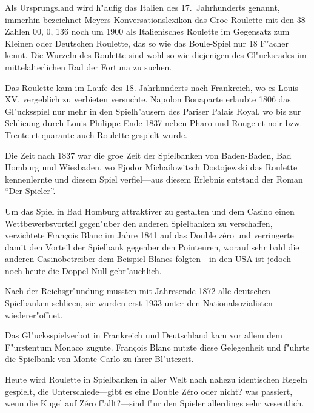 Als Ursprungsland wird h"aufig das Italien des 17.~Jahrhunderts
genannt, immerhin bezeichnet Meyers Konversationslexikon das Gro\3e
Roulette mit den 38 Zahlen 00, 0, 136 noch um 1900 als Italienisches
Roulette  im Gegensatz zum Kleinen oder Deutschen Roulette, das so
wie das Boule-Spiel nur 18 F"acher kennt. Die Wurzeln des Roulette
sind wohl so wie diejenigen des Gl"ucksrades im mittelalterlichen Rad
der Fortuna zu suchen.

Das Roulette kam im Laufe des 18. Jahrhunderts nach Frankreich, wo
es Louis XV. vergeblich zu verbieten versuchte. Napolon Bonaparte
erlaubte 1806 das Gl"ucksspiel nur mehr in den Spielh"ausern des Pariser
Palais Royal, wo bis zur Schlie\3ung durch Louis Philippe Ende 1837
neben Pharo und Rouge et noir bzw. Trente et quarante auch Roulette
gespielt wurde.

Die Zeit nach 1837 war die gro\3e Zeit der Spielbanken von Baden-Baden,
Bad Homburg und Wiesbaden, wo Fjodor Michailowitsch Dostojewski das
Roulette kennenlernte und diesem Spiel verfiel---aus diesem Erlebnis
entstand der Roman ``Der Spieler''.

Um das Spiel in Bad Homburg attraktiver zu gestalten und dem Casino
einen Wettbewerbsvorteil gegen"uber den anderen Spielbanken zu
verschaffen, verzichtete Fran\c{c}ois Blanc im Jahre 1841 auf das Double
z\'ero und verringerte damit den Vorteil der Spielbank gegenber den
Pointeuren, worauf sehr bald die anderen Casinobetreiber dem Beispiel
Blancs folgten---in den USA ist jedoch noch heute die Doppel-Null
gebr"auchlich.

Nach der Reichsgr"undung mussten mit Jahresende 1872 alle deutschen
Spielbanken schlie\3en, sie wurden erst 1933 unter den Nationalsozialisten
wiederer"offnet.

Das Gl"ucksspielverbot in Frankreich und Deutschland kam vor allem
dem F"urstentum Monaco zugute. Fran\c{c}ois Blanc nutzte diese Gelegenheit
und f"uhrte die Spielbank von Monte Carlo zu ihrer Bl"utezeit.

Heute wird Roulette in Spielbanken in aller Welt nach nahezu
identischen Regeln gespielt, die Unterschiede---gibt es eine Double
Z\'ero oder nicht? was passiert, wenn die Kugel auf Z\'ero f"allt?---sind
f"ur den Spieler allerdings sehr wesentlich.

